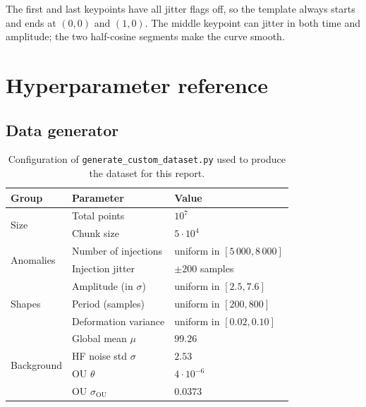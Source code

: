 The first and last keypoints have all jitter flags off, so the template
always starts and ends at $(0,0)$ and $(1,0)$. The middle keypoint can
jitter in both time and amplitude; the two half-cosine segments make
the curve smooth.

\section{Hyperparameter reference}
\label{app:hp}

\subsection{Data generator}
\label{app:hp-gen}

\begin{table}[H]
    \centering
    \footnotesize
    \begin{tabular}{lll}
        \toprule
        Group & Parameter & Value \\
        \midrule
        \multirow{2}{*}{Size}     & Total points          & $10^{7}$ \\
                                   & Chunk size            & $5 \cdot 10^{4}$ \\
        \midrule
        \multirow{2}{*}{Anomalies}& Number of injections  & uniform in $[5\,000, 8\,000]$ \\
                                   & Injection jitter      & $\pm 200$ samples \\
        \midrule
        \multirow{3}{*}{Shapes}   & Amplitude (in $\sigma$) & uniform in $[2.5, 7.6]$ \\
                                   & Period (samples)        & uniform in $[200, 800]$ \\
                                   & Deformation variance    & uniform in $[0.02, 0.10]$ \\
        \midrule
        \multirow{4}{*}{Background}& Global mean $\mu$    & $99.26$ \\
                                   & HF noise std $\sigma$ & $2.53$ \\
                                   & OU $\theta$           & $4 \cdot 10^{-6}$ \\
                                   & OU $\sigma_{\mathrm{OU}}$ & $0.0373$ \\
        \bottomrule
    \end{tabular}
    \caption{Configuration of \texttt{generate\_custom\_dataset.py} used
    to produce the dataset for this report.}
    \label{tab:gen-config}
\end{table}

